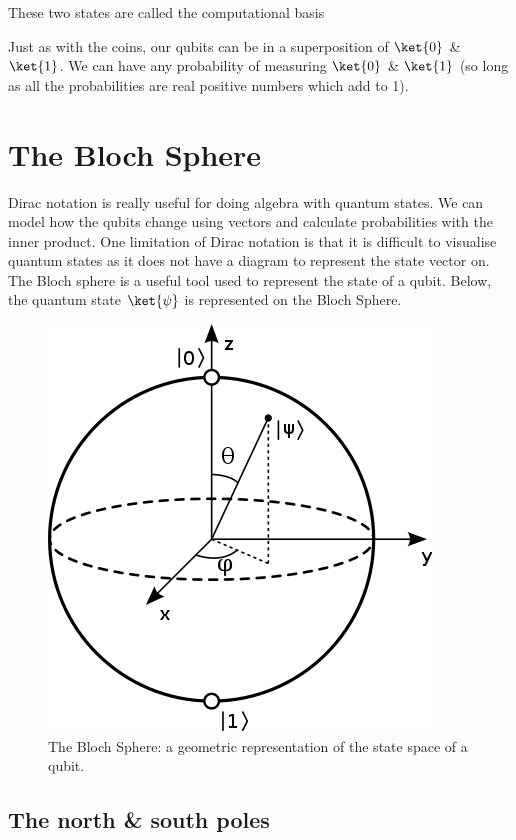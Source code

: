 \documentclass{book}
\begin{document}
These two states are called the computational basis

Just as with the coins, our qubits can be in a superposition of $\ket{0}$ \& $\ket{1}$. We can have any probability of measuring $\ket{0}$ \& $\ket{1}$ (so long as all the probabilities are real positive numbers which add to 1). 

\section{ The Bloch Sphere }

Dirac notation is really useful for doing algebra with quantum states. We can model how the qubits change using vectors and calculate probabilities with the inner product. One limitation of Dirac notation is that it is difficult to visualise quantum states as it does not have a diagram to represent the state vector on. The Bloch sphere is a useful tool used to represent the state of a qubit. Below, the quantum state $\ket{\psi}$ is represented on the Bloch Sphere. 

\begin{figure}[ht!]
    \centering
    \includegraphics[scale=0.5]{images/Bloch_Sphere.png}
    \caption{The Bloch Sphere: a geometric representation of the state space of a qubit.}
    \label{fig:bloch_sphere}
\end{figure}


\subsection{The north \& south poles}
\end{document}
